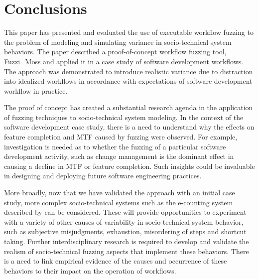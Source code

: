 \documentclass{llncs}
\begin{document}

\section{Conclusions}


This paper has presented and evaluated the use of executable workflow fuzzing to the problem of modeling and simulating
variance in socio-technical system behaviors.  The paper described a proof-of-concept workflow fuzzing tool, Fuzzi\_Moss
and applied it in a case study of software development workflows.  The approach was demonstrated to introduce realistic
variance due to distraction into idealized workflows in accordance with expectations of software development workflow in
practice.

The proof of concept has created a substantial research agenda in the application of fuzzing techniques to
socio-technical system modeling.  In the context of the software development case study, there is a need to understand
why the effects on feature completion and MTF caused by fuzzing were observed.  For example, investigation is needed as
to whether the fuzzing of a particular software development activity, such as change management is the dominant effect
in causing a decline in MTF or feature completion.  Such insights could be invaluable in designing and deploying future
software engineering practices.

More broadly, now that we have validated the approach with an initial case study, more complex socio-technical systems
such as the e-counting system described by \citet{lock07observations} can be considered.  These will provide
opportunities to experiment with a variety of other causes of variability in socio-technical system behavior, such as
subjective misjudgments, exhaustion, misordering of steps and shortcut taking.  Further interdisciplinary research is
required to develop and validate the realism of socio-technical fuzzing aspects that implement these behaviors. There is
a need to link empirical evidence of the causes and occurrence of these behaviors to their impact on the operation of
workflows.
\end{document}
